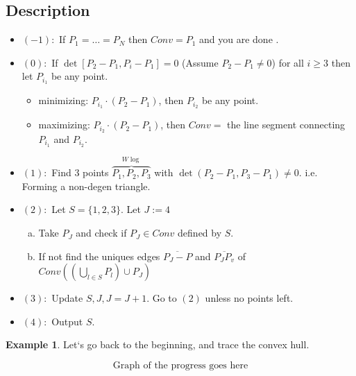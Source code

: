 \documentclass[]{article}
\theoremstyle{definition}
\newtheorem{ex}{Example}[section]
\begin{document}
			\subsection{Description}
			\begin{itemize}
			\item $(-1):$ If $P_1=\ldots=P_N$ then $Conv=P_1$ and you are done \Smiley.\\
			
			\item $(0):$ If $\det[P_2-P_1,P_i-P_1]=0$ (Assume $P_2-P_1\neq 0$) for all $i\geq 3$ then let $P_{i_1}$ be any point.
				\begin{itemize}
			\item minimizing: $P_{i_1}\cdot(P_2-P_1)$, then $P_{i_2}$ be any point.
			\item maximizing: $P_{i_2}\cdot(P_2-P_1)$, then $Conv =$ the line segment connecting $P_{i_1}$ and $P_{i_2}$.
						\end{itemize}
			\item $(1):$ Find 3 points $\overbrace{P_1,P_2,P_3}^{W\log}$ with $\det(P_2-P_1,P_3-P_1) \neq 0.$
			i.e. Forming a non-degen triangle.
			\item $(2):$ Let $S=\{1,2,3\}$. Let $J:= 4$
				\begin{enumerate}[(a)]
				\item Take $P_J$ and check if $P_J \in Conv$ defined by $S$.
				\item If not find the uniques edges $\overline{P_J-P}$ and $\overline{P_JP_v}$ of $Conv((\bigcup_{l\in S} P_{l})\cup P_J)$
				\end{enumerate}
			\item $(3):$ Update $S, J, J=J+1.$ Go to $(2)$ unless no points left.
			\item $(4):$ Output $S$.
			\end{itemize}
			\begin{ex} Let`s go back to the beginning, and trace the convex hull.
			\end{ex}
						\[ \text{Graph of the progress goes here}\]
\end{document}

